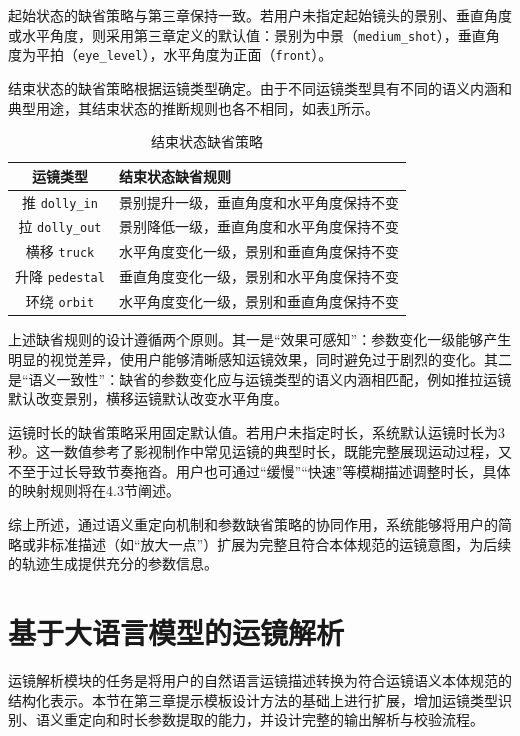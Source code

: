 起始状态的缺省策略与第三章保持一致。若用户未指定起始镜头的景别、垂直角度或水平角度，则采用第三章定义的默认值：景别为中景（\texttt{medium\_shot}），垂直角度为平拍（\texttt{eye\_level}），水平角度为正面（\texttt{front}）。

结束状态的缺省策略根据运镜类型确定。由于不同运镜类型具有不同的语义内涵和典型用途，其结束状态的推断规则也各不相同，如表\ref{tab:end_state_default}所示。

\begin{table}[htbp]
\centering
\caption{结束状态缺省策略}
\label{tab:end_state_default}
\begin{tabular}{cp{9.5cm}}
\toprule
运镜类型 & 结束状态缺省规则 \\
\midrule
推 \texttt{dolly\_in} & 景别提升一级，垂直角度和水平角度保持不变 \\
拉 \texttt{dolly\_out} & 景别降低一级，垂直角度和水平角度保持不变 \\
横移 \texttt{truck} & 水平角度变化一级，景别和垂直角度保持不变 \\
升降 \texttt{pedestal} & 垂直角度变化一级，景别和水平角度保持不变 \\
环绕 \texttt{orbit} & 水平角度变化一级，景别和垂直角度保持不变 \\
\bottomrule
\end{tabular}
\end{table}

上述缺省规则的设计遵循两个原则。其一是“效果可感知”：参数变化一级能够产生明显的视觉差异，使用户能够清晰感知运镜效果，同时避免过于剧烈的变化。其二是“语义一致性”：缺省的参数变化应与运镜类型的语义内涵相匹配，例如推拉运镜默认改变景别，横移运镜默认改变水平角度。

运镜时长的缺省策略采用固定默认值。若用户未指定时长，系统默认运镜时长为$3$秒。这一数值参考了影视制作中常见运镜的典型时长，既能完整展现运动过程，又不至于过长导致节奏拖沓。用户也可通过“缓慢”“快速”等模糊描述调整时长，具体的映射规则将在4.3节阐述。

综上所述，通过语义重定向机制和参数缺省策略的协同作用，系统能够将用户的简略或非标准描述（如“放大一点”）扩展为完整且符合本体规范的运镜意图，为后续的轨迹生成提供充分的参数信息。

\section{基于大语言模型的运镜解析}

运镜解析模块的任务是将用户的自然语言运镜描述转换为符合运镜语义本体规范的结构化表示。本节在第三章提示模板设计方法的基础上进行扩展，增加运镜类型识别、语义重定向和时长参数提取的能力，并设计完整的输出解析与校验流程。

